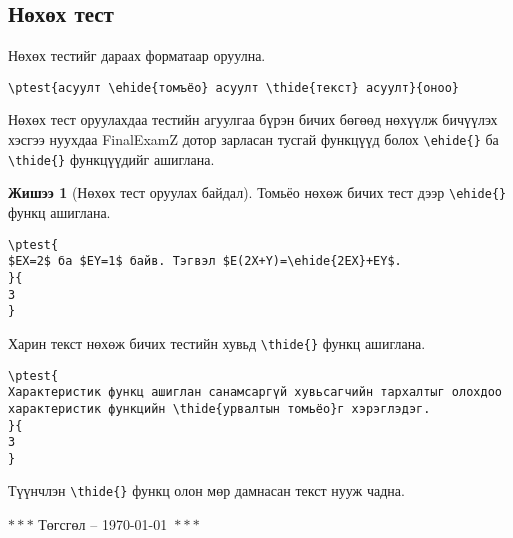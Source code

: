 \documentclass[10pt]{article}
\theoremstyle{definition}
\newtheorem{example}{Жишээ}
\begin{document}
\subsection{Нөхөх тест}

Нөхөх тестийг дараах форматаар оруулна.
\begin{verbatim}
\ptest{асуулт \ehide{томъёо} асуулт \thide{текст} асуулт}{оноо}
\end{verbatim}
Нөхөх тест оруулахдаа тестийн агуулгаа бүрэн бичих бөгөөд нөхүүлж бичүүлэх хэсгээ нуухдаа FinalExamZ дотор зарласан тусгай функцүүд болох \verb|\ehide{}| ба \verb|\thide{}| функцүүдийг ашиглана.

\begin{example}[Нөхөх тест оруулах байдал]
Томьёо нөхөж бичих тест дээр \verb|\ehide{}| функц ашиглана.
\begin{verbatim}
\ptest{
$EX=2$ ба $EY=1$ байв. Тэгвэл $E(2X+Y)=\ehide{2EX}+EY$.
}{
3
}
\end{verbatim}
Харин текст нөхөж бичих тестийн хувьд \verb|\thide{}| функц ашиглана.
\begin{verbatim}
\ptest{
Характеристик функц ашиглан санамсаргүй хувьсагчийн тархалтыг олохдоо 
характеристик функцийн \thide{урвалтын томьёо}г хэрэглэдэг.
}{
3
}
\end{verbatim}
\end{example}

Түүнчлэн \verb|\thide{}| функц олон мөр дамнасан текст нууж чадна.

\begin{center}
 $\ast\ast\ast$ Төгсгөл -- \today\ $\ast\ast\ast$
\end{center}
\end{document}

